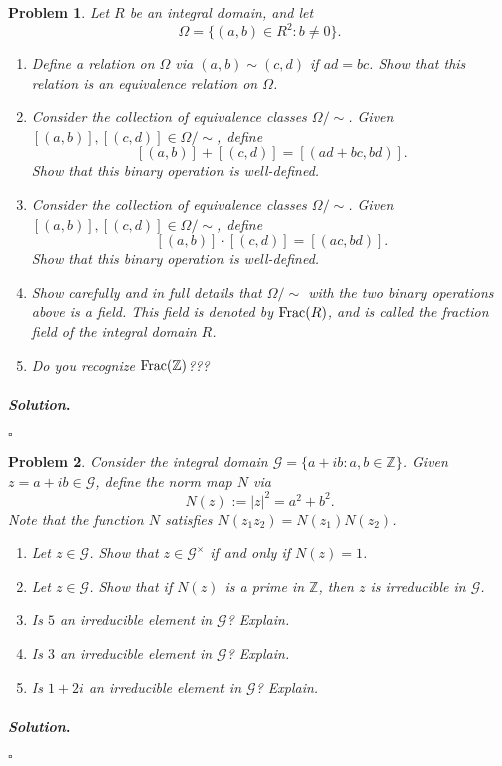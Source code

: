 \documentclass[reqno]{amsart}
\theoremstyle{plain}
\newtheorem{problem}{Problem}
\theoremstyle{definition}
\newenvironment{solution}{\paragraph{\emph{Solution}.}}{\hfill$\square$}
\begin{document}
\begin{problem}
Let $R$ be an integral domain, and let
$$\Omega = \{(a,b) \in R^{2} : b \neq 0 \}. $$
\begin{enumerate}
\item Define a relation on $\Omega$ via $(a,b) \sim (c,d)$ if $ad = bc$.  Show that this relation is an equivalence relation on $\Omega$.
\item Consider the collection of equivalence classes $\Omega/\sim$.  Given $[(a,b)], [(c,d)] \in \Omega/\sim$, define
$$[(a,b)] + [(c,d)] = [(ad + bc, bd)]. $$
Show that this binary operation is well-defined.
\item Consider the collection of equivalence classes $\Omega/\sim$.  Given $[(a,b)], [(c,d)] \in \Omega/\sim$, define
$$[(a,b)] \cdot [(c,d)] = [(ac,bd)]. $$
Show that this binary operation is well-defined.
\item Show carefully and in full details that $\Omega/\sim$ with the two binary operations above is a field.  This field is denoted by ${\rm Frac}(R)$, and is called the fraction field of the integral domain $R$.
\item Do you recognize ${\rm Frac}(\mathbb{Z})$???
\end{enumerate}

\end{problem}
\begin{solution}

\end{solution}


\begin{problem}
Consider the integral domain $\mathcal{G} = \{ a+ib : a, b \in \mathbb{Z}\}$.  Given $z = a + ib \in \mathcal{G}$, define the norm map $N$ via
$$N(z) := |z|^{2} = a^{2} + b^{2}. $$
Note that the function $N$ satisfies $N(z_{1}z_{2}) = N(z_{1})N(z_{2})$.
\begin{enumerate}
\item Let $z \in \mathcal{G}$.  Show that $z \in \mathcal{G}^{\times}$ if and only if $N(z) = 1$.
\item Let $z \in \mathcal{G}$.  Show that if $N(z)$ is a prime in $\mathbb{Z}$, then $z$ is irreducible in $\mathcal{G}$.
\item Is $5$ an irreducible element in $\mathcal{G}$?  Explain.
\item Is $3$ an irreducible element in $\mathcal{G}$?  Explain.
\item Is $1 + 2i$ an irreducible element in $\mathcal{G}$?  Explain.
\end{enumerate}
\end{problem}
\begin{solution}

\end{solution}
\end{document}
